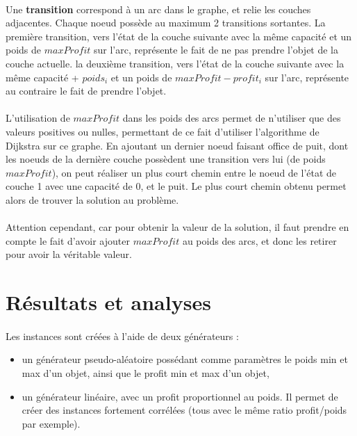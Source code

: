 \documentclass[12pt]{article}
\begin{document}
\paragraph{}Une \textbf{transition} correspond à un arc dans le graphe, et relie les couches adjacentes. Chaque noeud possède au maximum 2 transitions sortantes. La première transition, vers l'état de la couche suivante avec la même capacité et un poids de $maxProfit$ sur l'arc, représente le fait de ne pas prendre l'objet de la couche actuelle. la deuxième transition, vers l'état de la couche suivante avec la même capacité + $poids_i$  et un poids de $maxProfit - profit_i$ sur l'arc, représente au contraire le fait de prendre l'objet.

\paragraph{}L'utilisation de $maxProfit$ dans les poids des arcs permet de n'utiliser que des valeurs positives ou nulles, permettant de ce fait d'utiliser l'algorithme de Dijkstra sur ce graphe. En ajoutant un dernier noeud faisant office de puit, dont les noeuds de la dernière couche possèdent une transition vers lui (de poids $maxProfit$), on peut réaliser un plus court chemin entre le noeud de l'état de couche 1 avec une capacité de 0, et le puit. Le plus court chemin obtenu permet alors de trouver la solution au problème.

\paragraph{}Attention cependant, car pour obtenir la valeur de la solution, il faut prendre en compte le fait d'avoir ajouter $maxProfit$ au poids des arcs, et donc les retirer pour avoir la véritable valeur. 

\section{Résultats et analyses}

\paragraph{}Les instances sont créées à l'aide de deux générateurs :
\begin{itemize}
\item un générateur pseudo-aléatoire possédant comme paramètres le poids min et max d'un objet, ainsi que le profit min et max d'un objet,
\item un générateur linéaire, avec un profit proportionnel au poids. Il permet de créer des instances fortement corrélées (tous avec le même ratio profit/poids par exemple).
\end{itemize}
\end{document}
